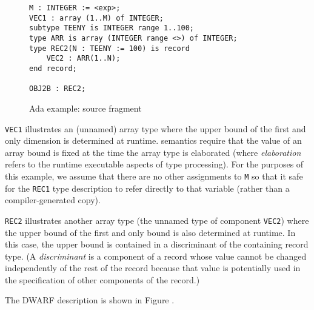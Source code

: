 \begin{figure}[here]
\begin{lstlisting}
M : INTEGER := <exp>;
VEC1 : array (1..M) of INTEGER;
subtype TEENY is INTEGER range 1..100;
type ARR is array (INTEGER range <>) of INTEGER;
type REC2(N : TEENY := 100) is record
    VEC2 : ARR(1..N);
end record;

OBJ2B : REC2;
\end{lstlisting}
\caption{Ada example: source fragment}
\label{fig:adaexamplesourcefragment}
\end{figure}

\texttt{VEC1} illustrates an (unnamed) array type where the upper bound
of the first and only dimension is determined at runtime. 
semantics require that the value of an array bound is fixed at
the time the array type is elaborated (where \textit{elaboration} refers
to the runtime executable aspects of type processing). For
the purposes of this example, we assume that there are no
other assignments to \texttt{M} so that it safe for the \texttt{REC1} type
description to refer directly to that variable (rather than
a compiler-generated copy).

\texttt{REC2} illustrates another array type (the unnamed type of
component \texttt{VEC2}) where the upper bound of the first and only
bound is also determined at runtime. In this case, the upper
bound is contained in a discriminant of the containing record
type. (A \textit{discriminant} is a component of a record whose value
cannot be changed independently of the rest of the record
because that value is potentially used in the specification
of other components of the record.)

The DWARF description is shown in 
Figure .


